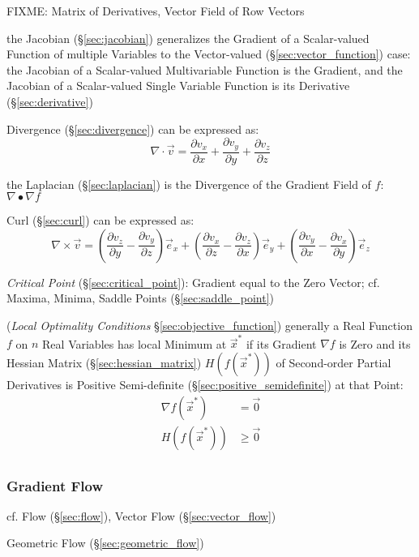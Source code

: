 FIXME: Matrix of Derivatives, Vector Field of Row Vectors

the Jacobian (\S\ref{sec:jacobian}) generalizes the Gradient of a Scalar-valued
Function of multiple Variables to the Vector-valued
(\S\ref{sec:vector_function}) case: the Jacobian of a Scalar-valued
Multivariable Function is the Gradient, and the Jacobian of a Scalar-valued
Single Variable Function is its Derivative (\S\ref{sec:derivative})

Divergence (\S\ref{sec:divergence}) can be expressed as:
\[
  \nabla \cdot \vec{v} =
    \frac{\partial v_x}{\partial x} +
    \frac{\partial v_y}{\partial y} +
    \frac{\partial v_z}{\partial z}
\]

the Laplacian (\S\ref{sec:laplacian}) is the Divergence of the Gradient Field
of $f$: $\nabla \bullet \nabla f$

Curl (\S\ref{sec:curl}) can be expressed as:
\[
  \nabla\times\vec{v} =
    (\frac{\partial v_z}{\partial y}-\frac{\partial v_y}{\partial z})\vec{e}_x +
    (\frac{\partial v_x}{\partial z}-\frac{\partial v_z}{\partial x})\vec{e}_y +
    (\frac{\partial v_y}{\partial x}-\frac{\partial v_x}{\partial y})\vec{e}_z
\]

\emph{Critical Point} (\S\ref{sec:critical_point}): Gradient equal to the Zero
Vector; cf. Maxima, Minima, Saddle Points (\S\ref{sec:saddle_point})

(\emph{Local Optimality Conditions} \S\ref{sec:objective_function}) generally a
Real Function $f$ on $n$ Real Variables has local Minimum at $\vec{x}^*$ if its
Gradient $\nabla f$ is Zero and its Hessian Matrix (\S\ref{sec:hessian_matrix})
$H(f(\vec{x}^*))$ of Second-order Partial Derivatives is Positive Semi-definite
(\S\ref{sec:positive_semidefinite}) at that Point:
\begin{align*}
  \nabla f(\vec{x}^*) & =    \vec{0} \\
  H(f(\vec{x}^*))     & \geq \vec{0} \\
\end{align*}



\subsubsection{Gradient Flow}\label{sec:gradient_flow}

cf. Flow (\S\ref{sec:flow}), Vector Flow (\S\ref{sec:vector_flow})

Geometric Flow (\S\ref{sec:geometric_flow})



